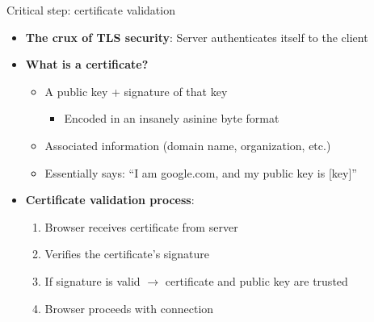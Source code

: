\ifdefined\PRESENTATION\else\PassOptionsToClass{handout}{beamer}\fi\documentclass[aspectratio=169, lualatex]{beamer}
\begin{document}
\begin{frame}{Critical step: certificate validation}
	\begin{itemize}[<+->]
		\item \textbf{The crux of TLS security}: Server authenticates itself to the client
		\item \textbf{What is a certificate?}
		      \begin{itemize}
			      \item A public key + signature of that key
			            \begin{itemize}
				            \item Encoded in an insanely asinine byte format
			            \end{itemize}
			      \item Associated information (domain name, organization, etc.)
			      \item Essentially says: ``I am google.com, and my public key is [key]''
		      \end{itemize}
		\item \textbf{Certificate validation process}:
		      \begin{enumerate}
			      \item Browser receives certificate from server
			      \item Verifies the certificate's signature
			      \item If signature is valid $\rightarrow$ certificate and public key are trusted
			      \item Browser proceeds with connection
		      \end{enumerate}
	\end{itemize}
\end{frame}
\end{document}
